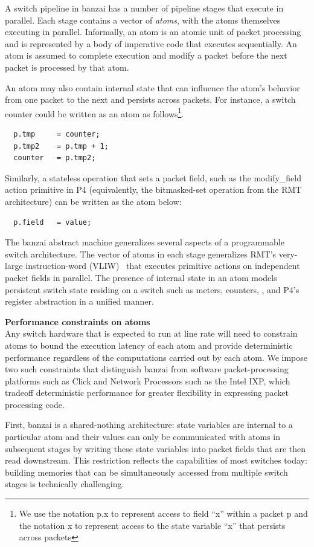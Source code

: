 A switch pipeline in banzai has a number of pipeline stages that execute in
parallel. Each stage contains a vector of \textit{atoms}, with the atoms
themselves executing in parallel. Informally, an atom is an atomic unit of
packet processing and is represented by a body of imperative code that executes
sequentially. An atom is assumed to complete execution and modify a packet
before the next packet is processed by that atom.

An atom may also contain internal state that can influence the atom's behavior
from one packet to the next and persists across packets. For instance, a switch
counter could be written as an atom as follows\footnote{We use the notation p.x
  to represent access to field ``x'' within a packet p and the notation x to
represent access to the state variable ``x'' that persists across packets}.
\begin{verbatim}
  p.tmp     = counter;
  p.tmp2    = p.tmp + 1;
  counter   = p.tmp2;
\end{verbatim}
Similarly, a stateless operation that sets a packet field, such as the
modify\_field action primitive in P4 (equivalently, the bitmasked-set operation
from the RMT architecture) can be written as the atom below:
\begin{verbatim}
  p.field   = value;
\end{verbatim}

The banzai abstract machine generalizes several aspects of a programmable
switch architecture. The vector of atoms in each stage generalizes RMT's
very-large instruction-word (VLIW)~\cite{rmt} that executes primitive actions
on independent packet fields in parallel. The presence of internal state in an
atom models persistent switch state residing on a switch such as meters,
counters, , and P4's register abstraction in a unified manner.

\textbf{Performance constraints on atoms} \\

Any switch hardware that is expected to run at line rate will need to constrain
atoms to bound the execution latency of each atom and provide deterministic
performance regardless of the computations carried out by each atom. We impose
two such constraints that distinguish banzai from software packet-processing
platforms such as Click and Network Processors such as the Intel IXP, which
tradeoff deterministic performance for greater flexibility in expressing packet
processing code.

First, banzai is a shared-nothing architecture: state variables are internal to
a particular atom and their values can only be communicated with atoms in
subsequent stages by writing these state variables into packet fields that are
then read downstream.  This restriction reflects the capabilities of most
switches today: building memories that can be simultaneously accessed from
multiple switch stages is technically challenging.

